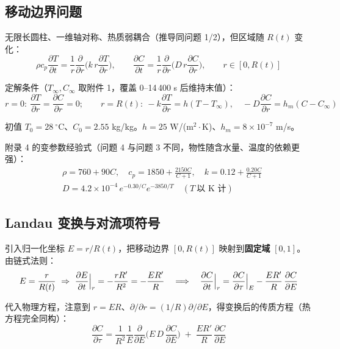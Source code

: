 \documentclass[11pt]{ctexart}
\newcommand{\pd}[2]{\frac{\partial #1}{\partial #2}}
\begin{document}
\subsection{移动边界问题}

无限长圆柱、一维轴对称、热质弱耦合（推导同问题 1/2），但区域随 $R(t)$ 变化：
\begin{equation}
\rho c_p\pd{T}{t}=\frac{1}{r}\pd{}{r}\Big(k\,r\pd{T}{r}\Big),\qquad
\pd{C}{t}=\frac{1}{r}\pd{}{r}\Big(D\,r\pd{C}{r}\Big),\qquad r\in[0,R(t)]
\end{equation}

定解条件（$T_\infty,C_\infty$ 取附件 1，覆盖 0--14\,400 s 后维持末值）：
\begin{equation}
r=0:\ \pd{T}{r}=\pd{C}{r}=0;\qquad
r=R(t):\ -k\pd{T}{r}=h(T-T_\infty),\quad -D\pd{C}{r}=h_m(C-C_\infty)
\end{equation}

初值 $T_0=28\ ^\circ\mathrm{C}$、$C_0=2.55$ kg/kg。$h=25$ W/(m$^2\cdot$K)、$h_m=8\times10^{-7}$ m/s。

附录 4 的变参数经验式（问题 4 与问题 3 不同，物性随含水量、温度的依赖更强）：
\begin{equation}
\begin{aligned}
&\rho=760+90C,\quad c_p=1850+\frac{2150C}{C+1},\quad k=0.12+\frac{0.20C}{C+1}\\[2pt]
&D=4.2\times10^{-4}\,e^{-0.30/C}e^{-3850/T}\quad(T\ \text{以 K 计})
\end{aligned}
\end{equation}

\subsection{Landau 变换与对流项符号}

引入归一化坐标 $E=r/R(t)$，把移动边界 $[0,R(t)]$ 映射到\textbf{固定域} $[0,1]$。由链式法则：
\begin{equation}
E=\frac{r}{R(t)}\ \Rightarrow\ \Bigl.\pd{E}{t}\Bigr|_r=-\frac{rR'}{R^2}=-\frac{ER'}{R}
\quad\Longrightarrow\quad
\Bigl.\pd{C}{t}\Bigr|_r=\Bigl.\pd{C}{\tau}\Bigr|_E-\frac{ER'}{R}\,\pd{C}{E}
\end{equation}

代入物理方程，注意到 $r=ER$、$\partial/\partial r=(1/R)\partial/\partial E$，得变换后的传质方程（热方程完全同构）：
\begin{equation}
\pd{C}{\tau}=\frac{1}{R^2}\frac{1}{E}\pd{}{E}\Big(E\,D\,\pd{C}{E}\Big)\;+\;\frac{E R'}{R}\,\pd{C}{E}
\end{equation}
\end{document}
